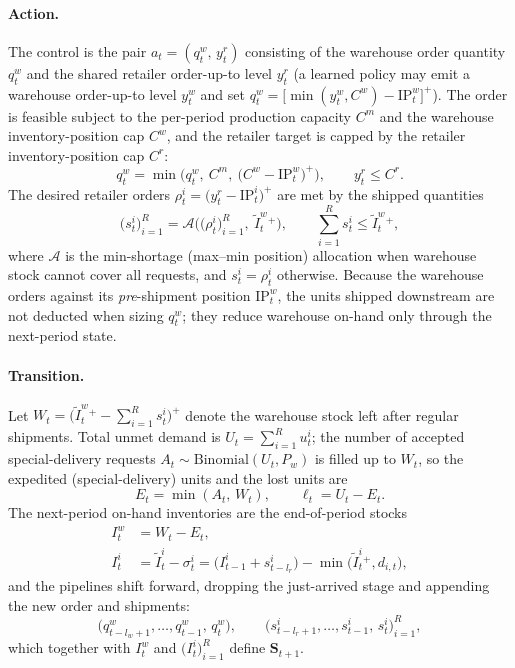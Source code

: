 \documentclass[11pt]{article}
\begin{document}
\paragraph{Action.}
The control is the pair $a_t=(q^w_t,\,y^r_t)$ consisting of the warehouse order quantity $q^w_t$
and the shared retailer order-up-to level $y^r_t$ (a learned policy may emit a warehouse
order-up-to level $y^w_t$ and set $q^w_t=\big[\min(y^w_t,C^w)-\mathrm{IP}^w_t\big]^+$). The order
is feasible subject to the per-period production capacity $C^m$ and the warehouse
inventory-position cap $C^w$, and the retailer target is capped by the retailer
inventory-position cap $C^r$:
\begin{equation*}
  q^w_t = \min\!\Big(q^w_t,\ C^m,\ \big(C^w-\mathrm{IP}^w_t\big)^+\Big),
  \qquad
  y^r_t \le C^r .
\end{equation*}
The desired retailer orders $\rho^i_t=\big(y^r_t-\mathrm{IP}^i_t\big)^+$ are met by the shipped
quantities
\begin{equation*}
  \big(s^i_t\big)_{i=1}^{R} = \mathcal A\!\Big(\big(\rho^i_t\big)_{i=1}^{R},\ \widetilde I^w_t{}^+\Big),
  \qquad \sum_{i=1}^{R} s^i_t \le \widetilde I^w_t{}^+ ,
\end{equation*}
where $\mathcal A$ is the min-shortage (max--min position) allocation when warehouse stock cannot
cover all requests, and $s^i_t=\rho^i_t$ otherwise. Because the warehouse orders against its
\emph{pre}-shipment position $\mathrm{IP}^w_t$, the units shipped downstream are not deducted when
sizing $q^w_t$; they reduce warehouse on-hand only through the next-period state.

\paragraph{Transition.}
Let $W_t=\big(\widetilde I^w_t{}^+-\sum_{i=1}^{R}s^i_t\big)^+$ denote the warehouse stock left
after regular shipments. Total unmet demand is $U_t=\sum_{i=1}^{R}u^i_t$; the number of accepted
special-delivery requests $A_t\sim\mathrm{Binomial}(U_t,P_w)$ is filled up to $W_t$, so the
expedited (special-delivery) units and the lost units are
\begin{equation*}
  E_t = \min(A_t,\,W_t),
  \qquad
  \ell_t = U_t - E_t .
\end{equation*}
The next-period on-hand inventories are the end-of-period stocks
\begin{align*}
  I^w_t &= W_t - E_t, \\
  I^i_t &= \widetilde I^i_t - \sigma^i_t = \big(I^i_{t-1}+s^i_{t-l_r}\big)-\min\!\big(\widetilde I^i_t{}^+,d_{i,t}\big),
\end{align*}
and the pipelines shift forward, dropping the just-arrived stage and appending the new order and
shipments:
\begin{equation*}
  \big(q^w_{t-l_w+1},\dots,q^w_{t-1},\,q^w_t\big),
  \qquad
  \big(s^i_{t-l_r+1},\dots,s^i_{t-1},\,s^i_t\big)_{i=1}^{R},
\end{equation*}
which together with $I^w_t$ and $\big(I^i_t\big)_{i=1}^{R}$ define $\mathbf S_{t+1}$.
\end{document}
